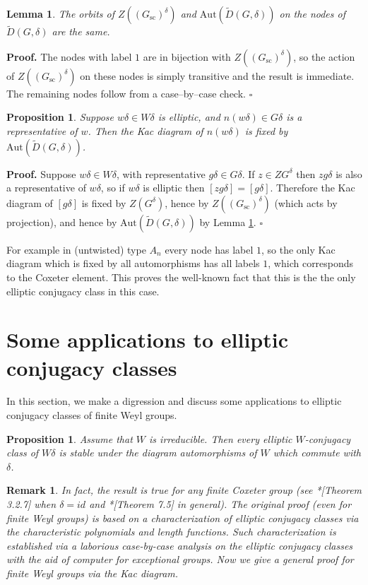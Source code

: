 \documentclass[10pt,leqno]{article}
\newtheorem{lemma}[equation]{Lemma}
\newtheorem{proposition}[equation]{Proposition}
\newtheorem{remark}[equation]{Remark}
{\theorembodyfont{\rmfamily}
\newtheorem{theoremplain}[equation]{Theorem}
\newtheorem{remarkplain}[equation]{Remark}
\newtheorem{editorialremarkplain}[equation]{Editorial Remark}
\newtheorem{exampleplain}[equation]{Example}
\newtheorem{corollaryplain}[equation]{Corollary}
}
\newcommand{\qed}{\hfill $\square$ \medskip}
\newenvironment{proof}[1][Proof]{\noindent\textbf{#1.} }{\qed}
\newcommand{\Aut}{\text{Aut}}
\newcommand{\Gsc}{G_{\text{sc}}}
\renewcommand{\sec}[1]{\section{#1}
\renewcommand{\theequation}{\thesection.\arabic{equation}}
  \setcounter{equation}{0}}
\newcommand\wt{\widetilde}
\newcommand{\Daffine}{\wt D(G,\delta)}
\def\d{\delta}
\renewcommand{\sec}[1]{\section{#1}
\renewcommand{\theequation}{\thesection.\arabic{equation}}
  \setcounter{equation}{0}}
\begin{document}
\begin{lemma}\label{6.7}
The orbits of  $Z((\Gsc)^\delta)$  and  $\Aut(\Daffine)$  on  the nodes of $\Daffine$
are the same.
\end{lemma}

\begin{proof}
The nodes with label $1$ are in bijection with $Z((\Gsc)^\delta)$,
so the action of $Z((\Gsc)^\delta)$ on these nodes is simply
transitive and the result is immediate.
The remaining nodes follow from a case--by--case check.
\end{proof}



\begin{proposition}
\label{p:fixed}
Suppose $w\delta\in W\delta$ is elliptic, and $n(w\delta)\in G\delta$ is a representative of $w$.
Then the Kac diagram of $n(w\delta)$ is fixed by $\Aut(\Daffine)$.
\end{proposition}

\begin{proof}
Suppose $w\delta\in W\delta$, with representative
$g\delta\in G\delta$.  If $z\in ZG^\delta$ then $zg\delta$ is also a
representative of $w\delta$, so if $w\delta$ is elliptic
then $[zg\delta]=[g\delta]$.  Therefore the Kac diagram of $[g\delta]$ is
fixed by $Z(G^\delta)$, hence by $Z((\Gsc)^\delta)$ (which acts by
projection), and hence by $\Aut(\Daffine)$ by 
Lemma \ref{6.7}.
\end{proof}


For example in (untwisted) type $A_n$ every node has label $1$, so the
only Kac diagram which is fixed by all automorphisms has all labels
$1$, which corresponds to the Coxeter element. This proves the well-known fact
that this is the the only elliptic conjugacy class in this case.


\sec{Some applications to elliptic conjugacy classes}
In this section, we make a digression and discuss some applications to elliptic conjugacy classes of finite Weyl groups. 

\begin{proposition}\label{stable-d'}
Assume that $W$ is irreducible. Then every elliptic $W$-conjugacy class of $W\delta$ is stable under the diagram automorphisms of $W$
which commute with $\delta$.
\end{proposition}

\begin{remark}
  In fact, the result is true for any finite Coxeter group (see \cite{geck_pfeiffer}*[Theorem 3.2.7] when $\d=id$ and
  \cite{he_minimal_length_double_cosets}*[Theorem 7.5] in general). The original proof (even for finite Weyl groups) is based on a characterization of elliptic conjugacy classes via the characteristic polynomials and length functions. Such characterization is established via a laborious case-by-case analysis on the elliptic conjugacy classes with the aid of computer for exceptional groups. Now we give a general proof for finite Weyl groups via the Kac diagram. 
\end{remark}
\end{document}
